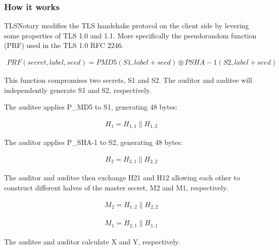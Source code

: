 \subsubsection{How it works}
TLSNotary modifies the TLS handshake protocol on the client side by levering some properties of TLS 1.0 and 1.1. More specifically the pseudorandom function (PRF) used in the TLS 1.0 RFC 2246.

\begin{ceqn}
    \begin{align}
        PRF(secret,label,seed) = PMD5(S1,label+seed) \otimes PSHA-1(S2,label+seed)
    \end{align}
\end{ceqn}

This function compromises two secrets, S1 and S2. The auditor and auditee will independently generate S1 and S2, respectively.

The auditee applies P\_MD5 to S1, generating 48 bytes:

\begin{ceqn}
    \begin{align}
        H_{1} = H_{1,1} \parallel H_{1,2}
    \end{align}
\end{ceqn}

The auditor applies P\_SHA-1 to S2, generating 48 bytes:

\begin{ceqn}
    \begin{align}
        H_{2} = H_{2,1} \parallel H_{2,2}
    \end{align}
\end{ceqn}


The auditor and auditee then exchange H21 and H12 allowing each other to construct different halves of the master secret, M2 and M1, respectively.

\begin{ceqn}
    \begin{align}
        M_{2} = H_{1,2} \parallel H_{2,2}
    \end{align}
\end{ceqn}

\begin{ceqn}
    \begin{align}
        M_{1} = H_{2,1} \parallel H_{1,1}
    \end{align}
\end{ceqn}

The auditee and auditor calculate X and Y, respectively.

